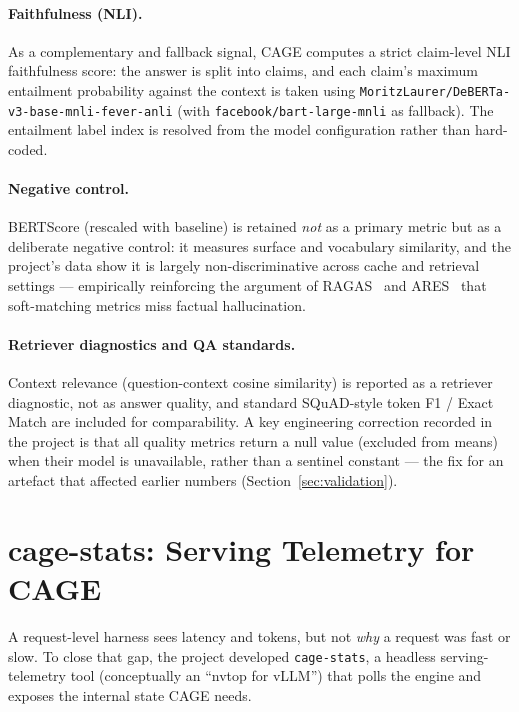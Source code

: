 \documentclass[12pt,a4paper]{article}
\let\cite\citep
\begin{document}
\paragraph{Faithfulness (NLI).} As a complementary and fallback signal, CAGE
computes a strict claim-level NLI faithfulness score: the answer is split into
claims, and each claim's maximum entailment probability against the context is
taken using \texttt{MoritzLaurer/DeBERTa-v3-base-mnli-fever-anli} (with
\texttt{facebook/bart-large-mnli} as fallback). The entailment label index is
resolved from the model configuration rather than hard-coded.

\paragraph{Negative control.} BERTScore (rescaled with baseline) is retained
\emph{not} as a primary metric but as a deliberate negative control: it measures
surface and vocabulary similarity, and the project's data show it is largely
non-discriminative across cache and retrieval settings --- empirically reinforcing
the argument of RAGAS~\cite{espejel2023ragas} and ARES~\cite{ares2024} that
soft-matching metrics miss factual hallucination.

\paragraph{Retriever diagnostics and QA standards.} Context relevance
(question-context cosine similarity) is reported as a retriever diagnostic, not as
answer quality, and standard SQuAD-style token F1 / Exact Match are included for
comparability. A key engineering correction recorded in the project is that all
quality metrics return a null value (excluded from means) when their model is
unavailable, rather than a sentinel constant --- the fix for an artefact that
affected earlier numbers (Section~\ref{sec:validation}).

\section{cage-stats: Serving Telemetry for CAGE}
\label{sec:cagestats}

A request-level harness sees latency and tokens, but not \emph{why} a request was
fast or slow. To close that gap, the project developed \texttt{cage-stats}, a
headless serving-telemetry tool (conceptually an ``nvtop for vLLM'') that polls the
engine and exposes the internal state CAGE needs.
\end{document}
